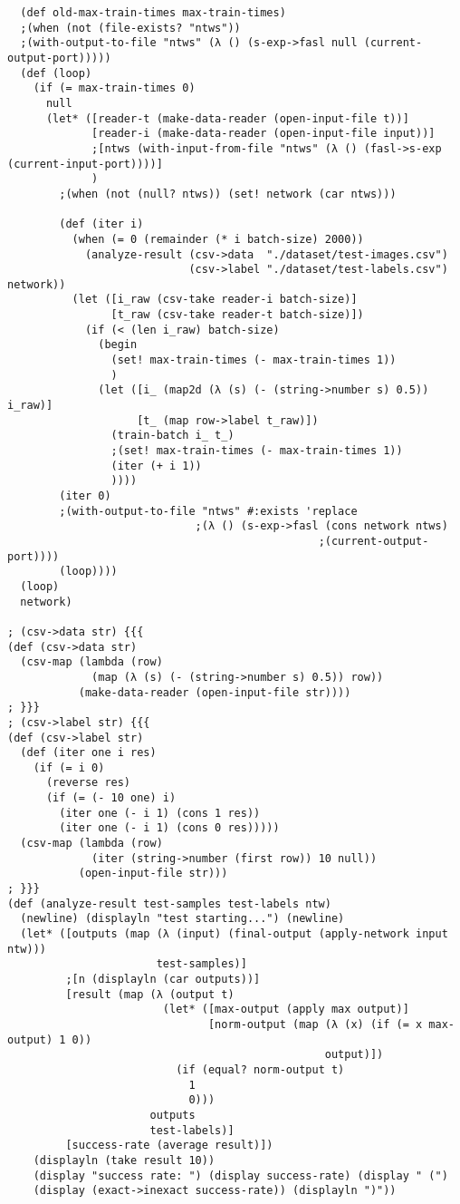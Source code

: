 \documentclass{article}
\begin{document}
\begin{lstlisting}
  (def old-max-train-times max-train-times)
  ;(when (not (file-exists? "ntws"))
  ;(with-output-to-file "ntws" (λ () (s-exp->fasl null (current-output-port)))))
  (def (loop)
    (if (= max-train-times 0)
      null
      (let* ([reader-t (make-data-reader (open-input-file t))]
             [reader-i (make-data-reader (open-input-file input))]
             ;[ntws (with-input-from-file "ntws" (λ () (fasl->s-exp (current-input-port))))]
             )
        ;(when (not (null? ntws)) (set! network (car ntws)))

        (def (iter i)
          (when (= 0 (remainder (* i batch-size) 2000))
            (analyze-result (csv->data  "./dataset/test-images.csv")
                            (csv->label "./dataset/test-labels.csv") network))
          (let ([i_raw (csv-take reader-i batch-size)]
                [t_raw (csv-take reader-t batch-size)])
            (if (< (len i_raw) batch-size)
              (begin
                (set! max-train-times (- max-train-times 1))
                )
              (let ([i_ (map2d (λ (s) (- (string->number s) 0.5)) i_raw)]
                    [t_ (map row->label t_raw)])
                (train-batch i_ t_)
                ;(set! max-train-times (- max-train-times 1))
                (iter (+ i 1))
                ))))
        (iter 0)
        ;(with-output-to-file "ntws" #:exists 'replace
                             ;(λ () (s-exp->fasl (cons network ntws)
                                                ;(current-output-port))))
        (loop))))
  (loop)
  network)

; (csv->data str) {{{
(def (csv->data str)
  (csv-map (lambda (row)
             (map (λ (s) (- (string->number s) 0.5)) row))
           (make-data-reader (open-input-file str))))
; }}}
; (csv->label str) {{{
(def (csv->label str)
  (def (iter one i res)
    (if (= i 0)
      (reverse res)
      (if (= (- 10 one) i)
        (iter one (- i 1) (cons 1 res))
        (iter one (- i 1) (cons 0 res)))))
  (csv-map (lambda (row)
             (iter (string->number (first row)) 10 null))
           (open-input-file str)))
; }}}
(def (analyze-result test-samples test-labels ntw)
  (newline) (displayln "test starting...") (newline)
  (let* ([outputs (map (λ (input) (final-output (apply-network input ntw)))
                       test-samples)]
         ;[n (displayln (car outputs))]
         [result (map (λ (output t)
                        (let* ([max-output (apply max output)]
                               [norm-output (map (λ (x) (if (= x max-output) 1 0))
                                                 output)])
                          (if (equal? norm-output t)
                            1
                            0)))
                      outputs
                      test-labels)]
         [success-rate (average result)])
    (displayln (take result 10))
    (display "success rate: ") (display success-rate) (display " (")
    (display (exact->inexact success-rate)) (displayln ")"))


\end{lstlisting}
\end{document}
